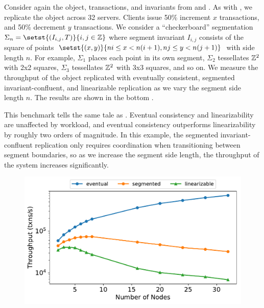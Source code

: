 \begin{benchmark}
  Consider again the object, transactions, and invariants from 
  and . As with , we replicate
  the object across 32 servers. Clients issue 50\% increment $x$ transactions,
  and 50\% decrement $y$ transactions. We consider a ``checkerboard''
  segmentation $\Sigma_n = \setst{(I_{i, j}, T)}{i, j \in \ints}$ where segment
  invariant $I_{i, j}$ consists of the square of points $\setst{(x, y)}{ni \leq
  x < n(i + 1), nj \leq y < n(j + 1)}$ with side length $n$. For example,
  $\Sigma_1$ places each point in its own segment, $\Sigma_2$ tessellates
  $\mathbb{Z}^2$ with 2x2 squares, $\Sigma_3$ tessellates $\mathbb{Z}^2$ with 3x3
  squares, and so on. We measure the throughput of the object replicated with
  eventually consistent, segmented invariant-confluent, and linearizable
  replication as we vary the segment side length $n$. The results are shown in
  the bottom .

  This benchmark tells the same tale as . Eventual
  consistency and linearizability are unaffected by workload, and eventual
  consistency outperforms linearizability by roughly two orders of magnitude.
  In this example, the segmented invariant-confluent replication only requires
  coordination when transitioning between segment boundaries, so as we increase
  the segment side length, the throughput of the system increases
  significantly.
\end{benchmark}

\begin{figure}[ht]
  \centering
  \includegraphics[width=\columnwidth]{figures/vary_nodes.pdf}
  \caption{}\figlabel{}
\end{figure}

